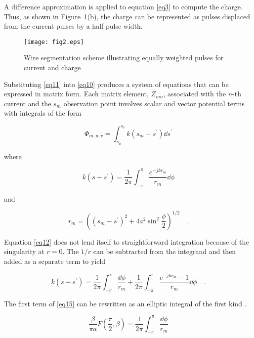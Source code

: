 \documentclass[12pt]{article}
\begin{document}
A difference approximation is applied to equation \eqref{eq3} to compute
the charge. Thus, as shown in Figure~\ref{fig2}(b), the charge can be
represented as pulses displaced from the current pulses by a half pulse
width.

\begin{figure}[htb]
\centerline{\texttt{[image: fig2.eps]}}
\caption{Wire segmentation scheme illustrating equally weighted pulses
for current and charge}
\label{fig2}
\end{figure}

Substituting \eqref{eq11} into \eqref{eq10} produces a system of
equations that can be expressed in matrix form. Each matrix element,
$Z_{mn}$, associated with the \mbox{$n$-th} current and the $s_m$ observation
point involves scalar and vector potential terms with integrals of the
form

\begin{equation}
\Phi_{m,u,v} = \int_{s_u}^{s_v} k(s_m - s^\prime)\dd{s^\prime}
\label{eq12}
\end{equation}

\noindent where

\begin{equation}
k(s-s^\prime) = \frac{1}{2\pi}\int_{-\pi}^\pi\frac{e^{-jkr_m}}{r_m}\dd{\phi}
\label{eq13}
\end{equation}

\noindent and

\begin{equation}
r_m = \left((s_m - s^\prime)^2 + 4a^2\sin^2\frac{\phi}{2}\right)^{1/2}
\quad.
\label{eq14}
\end{equation}

Equation \eqref{eq12} does not lend itself to straightforward
integration because of the singularity at $r=0$. The $1/r$ can be
subtracted from the integrand and then added as a separate term to yield

\begin{equation}
k(s-s^\prime) = \frac{1}{2\pi}\int_{-\pi}^\pi \frac{\dd{\phi}}{r_m}
+\frac{1}{2\pi}\int_{-\pi}^\pi\frac{e^{-jkr_m}-1}{r_m}\dd{\phi}
\quad.
\label{eq15}
\end{equation}

The first term of \eqref{eq15} can be rewritten as an elliptic integral
of the first kind \cite{r6}.

\begin{equation}
\frac{\beta}{\pi a}F\left(\frac{\pi}{2}, \beta\right) =
\frac{1}{2\pi}\int_{-\pi}^\pi\frac{\dd{\phi}}{r_m}
\label{eq16}
\end{equation}
\end{document}

